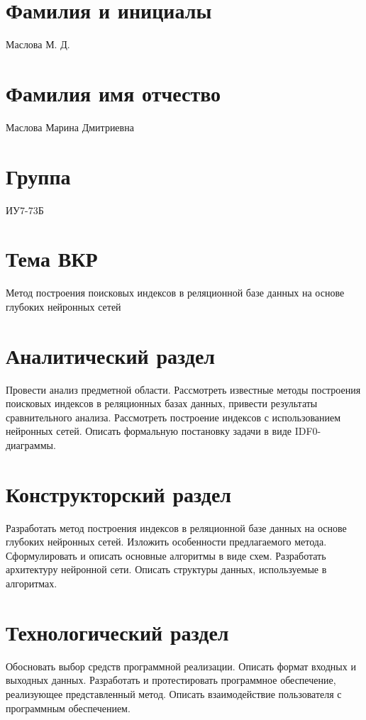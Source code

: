 \documentclass{bmstu}
\begin{document}
\section*{Фамилия и инициалы}

Маслова М. Д.

\section*{Фамилия имя отчество}

Маслова Марина Дмитриевна

\section*{Группа}

ИУ7-73Б

\section*{Тема ВКР}

Метод построения поисковых индексов в реляционной базе данных на основе глубоких
нейронных сетей

\section*{Аналитический раздел}

Провести анализ предметной области. Рассмотреть известные методы построения
поисковых индексов в реляционных базах данных, привести результаты
сравнительного анализа. Рассмотреть построение индексов с использованием
нейронных сетей. Описать формальную постановку задачи в виде IDF0-диаграммы.

\section*{Конструкторский раздел}

Разработать метод построения индексов в реляционной базе данных на основе
глубоких нейронных сетей. Изложить особенности предлагаемого метода.
Сформулировать и описать основные алгоритмы в виде схем. Разработать архитектуру
нейронной сети. Описать структуры данных, используемые в алгоритмах.

\section*{Технологический раздел}

Обосновать выбор средств программной реализации. Описать формат входных и
выходных данных. Разработать и протестировать программное обеспечение,
реализующее представленный метод. Описать взаимодействие
пользователя с программным обеспечением.
\end{document}
